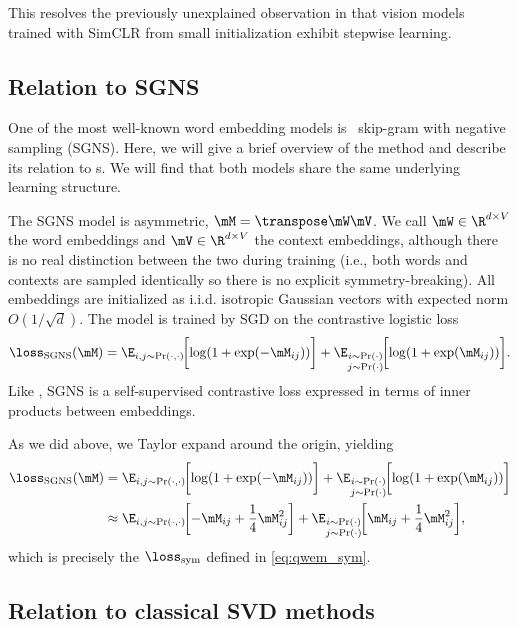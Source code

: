 This resolves the previously unexplained observation in \cite{simon2023stepwise} that vision models trained with SimCLR from small initialization exhibit stepwise learning.

\subsection{Relation to SGNS}

One of the most well-known word embedding models is \wtv\ skip-gram with negative sampling (SGNS). Here, we will give a brief overview of the method and describe its relation to \wem s. We will find that both models share the same underlying learning structure.

The SGNS model is asymmetric, $\mM=\transpose\mW\mV$. We call $\mW\in\R^{d\times V}$ the word embeddings and $\mV\in\R^{d\times V}$ the context embeddings, although there is no real distinction between the two during training (i.e., both words and contexts are sampled identically so there is no explicit symmetry-breaking). All embeddings are initialized as i.i.d. isotropic Gaussian vectors with expected norm $O(1/\sqrt{d})$. The model is trained by SGD on the contrastive logistic loss
\begin{equation}
    \loss_\mathrm{SGNS}(\mM) = \E_{i,j\sim \Pr(\cdot,\cdot)}\!\bigg[{\log(1+\exp(-\mM_{ij}))}\bigg] 
    + \E_{\substack{i\sim \Pr(\cdot)\\j\sim \Pr(\cdot)}}\! \bigg[{\log(1+\exp(\mM_{ij}))}\bigg].
\end{equation}
Like \wem, SGNS is a self-supervised contrastive loss expressed in terms of inner products between embeddings.

As we did above, we Taylor expand around the origin, yielding
\begin{align}
    \loss_\mathrm{SGNS}(\mM) &= \E_{i,j\sim \Pr(\cdot,\cdot)}\!\bigg[{\log(1+\exp(-\mM_{ij}))}\bigg] 
    + \E_{\substack{i\sim \Pr(\cdot)\\j\sim \Pr(\cdot)}}\! \bigg[{\log(1+\exp(\mM_{ij}))}\bigg] \\
    &\approx \E_{i,j\sim \Pr(\cdot,\cdot)}\!\bigg[{-\mM_{ij} + \frac{1}{4}\mM_{ij}^2}\bigg] 
    + \E_{\substack{i\sim \Pr(\cdot)\\j\sim \Pr(\cdot)}}\! \bigg[\mM_{ij} + \frac{1}{4}\mM_{ij}^2\bigg],
\end{align}
which is precisely the $\losssym$ defined in \cref{eq:qwem_sym}.

\subsection{Relation to classical SVD methods}

